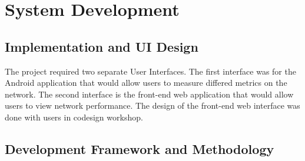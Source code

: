 \section{System Development}\label{sec:system-development}
\subsection{Implementation and UI Design}\label{subsec:implementation-and-ui-design}
The project required two separate User Interfaces.
The first interface was for the Android application that would allow users to measure differed metrics on the network.
The second interface is the front-end web application that would allow users to view network performance.
The design of the front-end web interface was done with users in codesign workshop.
\subsection{Development Framework and Methodology}\label{subsec:development-framework-and-methodology}
